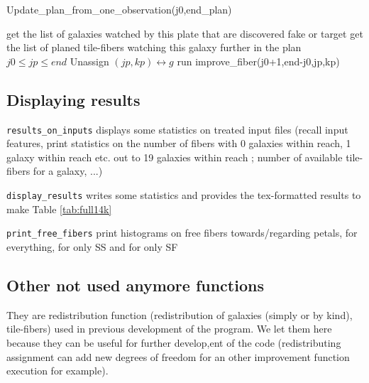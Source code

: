 \documentclass{extarticle}
\begin{document}
\begin{multicols}{2}
\begin{algorithm}[H]
	\caption{Update\_plan\_from\_one\_observation(j0,end\_plan)}\label{euclid}
	\begin{algorithmic}[1]
		\State get the list of galaxies watched by this plate that are discovered fake or target
		\State get the list of planed tile-fibers watching this galaxy further in the plan $j0\le jp \le end$
		\State Unassign $(jp,kp) \longleftrightarrow g$
		\State run improve\_fiber(j0+1,end-j0,jp,kp)
		\EndFor
		\EndFor
	\end{algorithmic}
\end{algorithm}


\subsection{Displaying results}
{\tt results\_on\_inputs} displays some statistics on treated input files (recall input features, print statistics on the number of fibers with 0 galaxies within reach, 1 galaxy within reach etc. out to 19 galaxies within reach ; number of available tile-fibers for a galaxy, ...)

{\tt display\_results} writes some statistics and provides the tex-formatted results to make Table \ref{tab:full14k}

{\tt print\_free\_fibers} print histograms on free fibers towards/regarding petals, for everything, for only SS and for only SF


\subsection{Other not used anymore functions}
They are redistribution function (redistribution of galaxies (simply or by kind), tile-fibers) used in previous development of the program. We let them here because they can be useful for further develop,ent of the code (redistributing assignment can add new degrees of freedom for an other improvement function execution for example).



\end{multicols}
\end{document}
